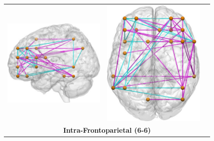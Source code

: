 \begin{figure}[ptbh]
\begin{tabular}{ccc}
		\includegraphics[height=\imheight]{6-6_lateral_flas.jpg}  &
		\includegraphics[height=\imheight]{6-6_superior_flas.jpg} \VSPACEE\\
		\multicolumn{3}{c}{\textbf{\large{Intra-Frontoparietal (6-6)}}} \VSPACE \\

\end{tabular}
\end{figure}
